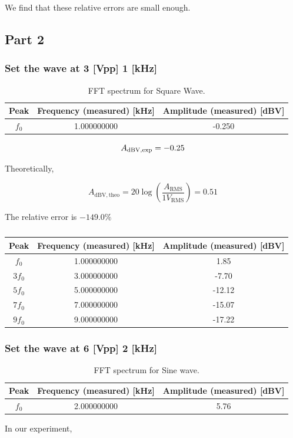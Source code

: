 \documentclass[a4paper]{report}
\begin{document}
We find that these relative errors are small enough.
\subsection{Part 2}
\subsubsection{Set the wave at 3 [Vpp] 1 [kHz]}
\begin{table}[H]
	\centering
	\begin{tabular}{|c|c|c|}
		\hline
		Peak  & Frequency (measured) [kHz] & Amplitude (measured) [dBV] \\
		\hline
		$f_0$ & 1.000000000                & -0.250                       \\
		\hline
	\end{tabular}
	\caption{FFT spectrum for Square Wave.}
\end{table}
$$A_{\rm{dBV,exp}}=-0.25$$

Theoretically,

$$A_{\mathrm{dBV,theo}}=20\log\left(\frac{A_{\mathrm{RMS}}}{1V_{\mathrm{RMS}}}\right)=0.51$$

The relative error is $-149.0\%$
\begin{table}[H]
	\centering
	\begin{tabular}{|c|c|c|}
		\hline
		Peak   & Frequency (measured) [kHz] & Amplitude (measured) [dBV] \\
		\hline
		$f_0$  & 1.000000000                & 1.85                       \\
		\hline
		$3f_0$ & 3.000000000                & -7.70                      \\
		\hline
		$5f_0$ & 5.000000000                & -12.12                     \\
		\hline
		$7f_0$ & 7.000000000                & -15.07                     \\
		\hline
		$9f_0$ & 9.000000000                      & -17.22                     \\
		\hline
	\end{tabular}
	\caption{}
\end{table}
\subsubsection{Set the wave at 6 [Vpp] 2 [kHz]}
\begin{table}[H]
	\centering
	\begin{tabular}{|c|c|c|}
		\hline
		Peak  & Frequency (measured) [kHz] & Amplitude (measured) [dBV] \\
		\hline
		$f_0$ & 2.000000000                & 5.76                       \\
		\hline
	\end{tabular}
	\caption{FFT spectrum for Sine wave.}
\end{table}
In our experiment,
\end{document}
